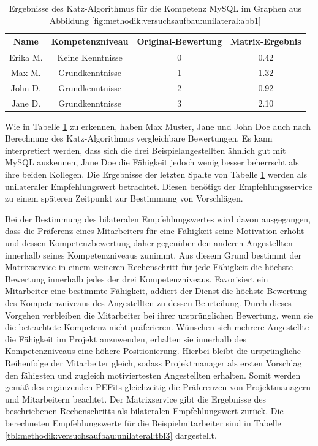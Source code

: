 \begin{table}[h]
	\centering
	\begin{tabular}{c|c|c|c}
		\textbf{Name} & \textbf{Kompetenzniveau} & \textbf{Original-Bewertung} & \textbf{Matrix-Ergebnis} \\
		\hline
		\rowcolor{exxetagray}Erika M. & Keine Kenntnisse & 0 & 0.42\\
		\hline
		\rowcolor{itemcolor}Max M.    & Grundkenntnisse  & 1 & 1.32\\
		\rowcolor{itemcolor}John D.   & Grundkenntnisse  & 2 & 0.92\\
		\rowcolor{itemcolor}Jane D.   & Grundkenntnisse  & 3 & 2.10
	\end{tabular}
	\caption{Ergebnisse des Katz-Algorithmus für die Kompetenz MySQL im Graphen aus Abbildung \ref{fig:methodik:versuchsaufbau:unilateral:abb1}}
	\label{tbl:methodik:versuchsaufbau:unilateral:tbl1}
\end{table}
\newpage
Wie in Tabelle \ref{tbl:methodik:versuchsaufbau:unilateral:tbl1} zu erkennen, haben Max Muster, Jane und John Doe auch nach Berechnung des Katz-Algorithmus vergleichbare Bewertungen. Es kann interpretiert werden, dass sich die drei Beispielangestellten ähnlich gut mit MySQL auskennen, Jane Doe die Fähigkeit jedoch wenig besser beherrscht als ihre beiden Kollegen. Die Ergebnisse der letzten Spalte von Tabelle \ref{tbl:methodik:versuchsaufbau:unilateral:tbl1} werden als unilateraler Empfehlungswert betrachtet. Diesen benötigt der Empfehlungsservice zu einem späteren Zeitpunkt zur Bestimmung von Vorschlägen.

Bei der Bestimmung des bilateralen Empfehlungswertes wird davon ausgegangen, dass die Präferenz eines Mitarbeiters für eine Fähigkeit seine Motivation erhöht und dessen Kompetenzbewertung daher gegenüber den anderen Angestellten innerhalb seines Kompetenzniveaus zunimmt. Aus diesem Grund bestimmt der Matrixservice in einem weiteren Rechenschritt für jede Fähigkeit die höchste Bewertung innerhalb jedes der drei Kompetenzniveaus. Favorisiert ein Mitarbeiter eine bestimmte Fähigkeit, addiert der Dienst die höchste Bewertung des Kompetenzniveaus des Angestellten zu dessen Beurteilung. Durch dieses Vorgehen verbleiben die Mitarbeiter bei ihrer ursprünglichen Bewertung, wenn sie die betrachtete Kompetenz nicht präferieren. Wünschen sich mehrere Angestellte die Fähigkeit im Projekt anzuwenden, erhalten sie innerhalb des Kompetenzniveaus eine höhere Positionierung. Hierbei bleibt die ursprüngliche Reihenfolge der Mitarbeiter gleich, sodass Projektmanager als ersten Vorschlag den fähigsten und zugleich motiviertesten Angestellten erhalten. Somit werden gemäß des ergänzenden \acp{PEFit} gleichzeitig die Präferenzen von Projektmanagern und Mitarbeitern beachtet. Der Matrixservice gibt die Ergebnisse des beschriebenen Rechenschritts als bilateralen Empfehlungswert zurück. Die berechneten Empfehlungswerte für die Beispielmitarbeiter sind in Tabelle \ref{tbl:methodik:versuchsaufbau:unilateral:tbl3} dargestellt.


